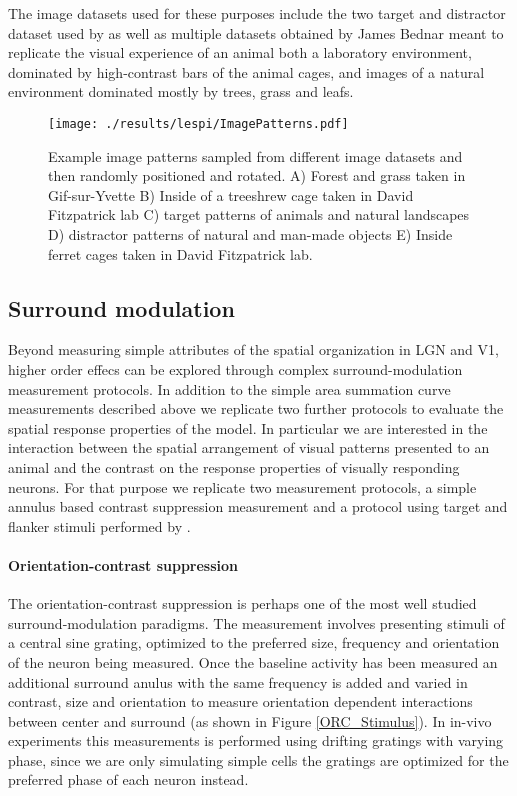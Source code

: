 The image datasets used for these purposes include the two target and
distractor dataset used by \cite{Serre2007} as well as multiple
datasets obtained by James Bednar meant to replicate the visual
experience of an animal both a laboratory environment, dominated by
high-contrast bars of the animal cages, and images of a natural
environment dominated mostly by trees, grass and leafs.

\begin{figure}
	\centering
	\texttt{[image: ./results/lespi/ImagePatterns.pdf]}
	\caption[Example image patterns used to train the model] {Example
      image patterns sampled from different image datasets and then
      randomly positioned and rotated. A) Forest and grass taken in
      Gif-sur-Yvette B) Inside of a treeshrew cage taken in David
      Fitzpatrick lab C) \cite{Serre07} target patterns of animals and
      natural landscapes D) \cite{Serre07} distractor patterns of
      natural and man-made objects E) Inside ferret cages taken in
      David Fitzpatrick lab.}
    \label{image_patterns}
\end{figure}

\subsection{Surround modulation}

Beyond measuring simple attributes of the spatial organization in LGN
and V1, higher order effecs can be explored through complex 
surround-modulation measurement protocols. In addition to the simple area
summation curve measurements described above we replicate two further
protocols to evaluate the spatial response properties of the model.
In particular we are interested in the interaction between the spatial
arrangement of visual patterns presented to an animal and the contrast
on the response properties of visually responding neurons. For that
purpose we replicate two measurement protocols, a simple annulus based
contrast suppression measurement \cite{Jones2002} and a protocol using
target and flanker stimuli performed by \cite{Kapadia1995}.

\paragraph{Orientation-contrast suppression}

The orientation-contrast suppression is perhaps one of the most well
studied surround-modulation paradigms. The measurement involves
presenting stimuli of a central sine grating, optimized to the
preferred size, frequency and orientation of the neuron being
measured. Once the baseline activity has been measured an additional
surround anulus with the same frequency is added and varied in
contrast, size and orientation to measure orientation dependent
interactions between center and surround (as shown in Figure
\ref{ORC_Stimulus}). In in-vivo experiments this measurements is
performed using drifting gratings with varying phase, since we are
only simulating simple cells the gratings are optimized for the
preferred phase of each neuron instead.

